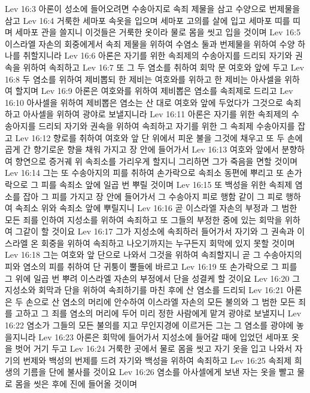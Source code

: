 Lev 16:3  아론이 성소에 들어오려면 수송아지로 속죄 제물을 삼고 수양으로 번제물을 삼고
Lev 16:4  거룩한 세마포 속옷을 입으며 세마포 고의를 살에 입고 세마포 띠를 띠며 세마포 관을 쓸지니 이것들은 거룩한 옷이라 물로 몸을 씻고 입을 것이며
Lev 16:5  이스라엘 자손의 회중에게서 속죄 제물을 위하여 수염소 둘과 번제물을 위하여 수양 하나를 취할지니라
Lev 16:6  아론은 자기를 위한 속죄제의 수송아지를 드리되 자기와 권속을 위하여 속죄하고
Lev 16:7  또 그 두 염소를 취하여 회막 문 여호와 앞에 두고
Lev 16:8  두 염소를 위하여 제비뽑되 한 제비는 여호와를 위하고 한 제비는 아사셀을 위하여 할지며
Lev 16:9  아론은 여호와를 위하여 제비뽑은 염소를 속죄제로 드리고
Lev 16:10  아사셀을 위하여 제비뽑은 염소는 산 대로 여호와 앞에 두었다가 그것으로 속죄하고 아사셀을 위하여 광야로 보낼지니라
Lev 16:11  아론은 자기를 위한 속죄제의 수송아지를 드리되 자기와 권속을 위하여 속죄하고 자기를 위한 그 속죄제 수송아지를 잡고
Lev 16:12  향로를 취하여 여호와 앞 단 위에서 피운 불을 그것에 채우고 또 두 손에 곱게 간 향기로운 향을 채워 가지고 장 안에 들어가서
Lev 16:13  여호와 앞에서 분향하여 향연으로 증거궤 위 속죄소를 가리우게 할지니 그리하면 그가 죽음을 면할 것이며
Lev 16:14  그는 또 수송아지의 피를 취하여 손가락으로 속죄소 동편에 뿌리고 또 손가락으로 그 피를 속죄소 앞에 일곱 번 뿌릴 것이며
Lev 16:15  또 백성을 위한 속죄제 염소를 잡아 그 피를 가지고 장 안에 들어가서 그 수송아지 피로 행함 같이 그 피로 행하여 속죄소 위와 속죄소 앞에 뿌릴지니
Lev 16:16  곧 이스라엘 자손의 부정과 그 범한 모든 죄를 인하여 지성소를 위하여 속죄하고 또 그들의 부정한 중에 있는 회막을 위하여 그같이 할 것이요
Lev 16:17  그가 지성소에 속죄하러 들어가서 자기와 그 권속과 이스라엘 온 회중을 위하여 속죄하고 나오기까지는 누구든지 회막에 있지 못할 것이며
Lev 16:18  그는 여호와 앞 단으로 나와서 그것을 위하여 속죄할지니 곧 그 수송아지의 피와 염소의 피를 취하여 단 귀퉁이 뿔들에 바르고
Lev 16:19  또 손가락으로 그 피를 그 위에 일곱 번 뿌려 이스라엘 자손의 부정에서 단을 성결케 할 것이요
Lev 16:20  그 지성소와 회막과 단을 위하여 속죄하기를 마친 후에 산 염소를 드리되
Lev 16:21  아론은 두 손으로 산 염소의 머리에 안수하여 이스라엘 자손의 모든 불의와 그 범한 모든 죄를 고하고 그 죄를 염소의 머리에 두어 미리 정한 사람에게 맡겨 광야로 보낼지니
Lev 16:22  염소가 그들의 모든 불의를 지고 무인지경에 이르거든 그는 그 염소를 광야에 놓을지니라
Lev 16:23  아론은 회막에 들어가서 지성소에 들어갈 때에 입었던 세마포 옷을 벗어 거기 두고
Lev 16:24  거룩한 곳에서 물로 몸을 씻고 자기 옷을 입고 나와서 자기의 번제와 백성의 번제를 드려 자기와 백성을 위하여 속죄하고
Lev 16:25  속죄제 희생의 기름을 단에 불사를 것이요
Lev 16:26  염소를 아사셀에게 보낸 자는 옷을 빨고 물로 몸을 씻은 후에 진에 들어올 것이며
